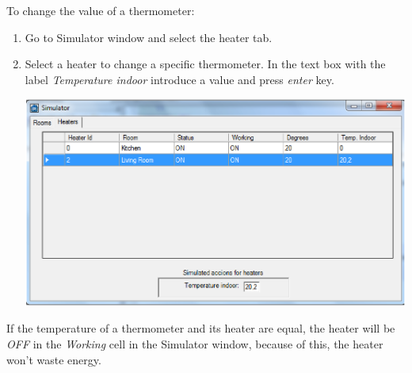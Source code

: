 To change the value of a thermometer:
\begin{enumerate}
\item Go to Simulator window and select the heater tab.
\item Select a heater to change a specific thermometer. In the text box with the label \emph{Temperature indoor} introduce a value and press \emph{enter} key.
\begin{center}
	\includegraphics[width=.68\linewidth]{images/thermometerHeater.eps}
	\\
\vspace{1cm}
\end{center}
\end{enumerate}
If the temperature of a thermometer and its heater are equal, the heater will be \emph{OFF} in the \emph{Working} cell in the Simulator window, because of this, the heater won't waste energy. 